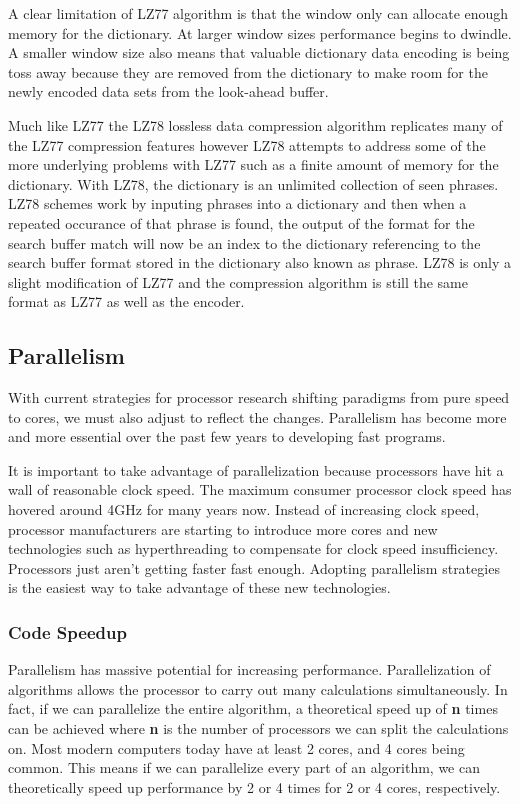 \documentclass[letterpaper, 12pt]{article}
\begin{document}
A clear limitation of LZ77 algorithm is that the window only can allocate enough memory for the dictionary. At
larger window sizes performance begins to dwindle. A smaller window size also means that valuable dictionary data
encoding is being toss away because they are removed from the dictionary to make room for the newly encoded data sets
from the look-ahead buffer.
\par\vspace{\baselineskip}
Much like LZ77 the LZ78 lossless data compression algorithm replicates many of the LZ77 compression features however
LZ78 attempts to address some of the more underlying problems with LZ77 such as a finite amount of memory for
the dictionary. With LZ78, the dictionary is an unlimited collection of seen phrases. LZ78 schemes work by inputing
phrases into a dictionary and then when a repeated occurance of that phrase is found, the output of the format for
the search buffer match will now be an index to the dictionary referencing to the search buffer format stored in
the dictionary also known as phrase. LZ78 is only a slight modification of LZ77 and the compression algorithm is still
the same format as LZ77 as well as the encoder.

\newpage

\subsection{Parallelism}
With current strategies for processor research shifting paradigms from pure speed to cores,
we must also adjust to reflect the changes. Parallelism has become more and more essential
over the past few years to developing fast programs.

\par\vspace{\baselineskip}

It is important to take advantage of parallelization because processors have hit a wall of
reasonable clock speed\citep{processorspeed}. The maximum consumer processor clock speed has
hovered around 4GHz for many years now. Instead of increasing clock speed, processor
manufacturers are starting to introduce more cores and new technologies such as hyperthreading
to compensate for clock speed insufficiency. Processors just aren't getting faster fast enough.
Adopting parallelism strategies is the easiest way to take advantage of these new technologies.

\subsubsection{Code Speedup}
Parallelism has massive potential for increasing performance. Parallelization of algorithms
allows the processor to carry out many calculations simultaneously. In fact, if we can
parallelize the entire algorithm, a theoretical speed up of {\bfseries n} times can be
achieved where {\bfseries n} is the number of processors we can split the calculations on.
Most modern computers today have at least 2 cores, and 4 cores being common. This means
if we can parallelize every part of an algorithm, we can theoretically speed up performance
by 2 or 4 times for 2 or 4 cores, respectively.
\end{document}
